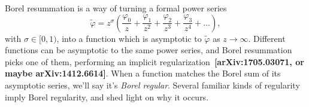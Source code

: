 \documentclass{article}
\newcommand{\series}[1]{\tilde{#1}}
\begin{document}
Borel resummation is a way of turning a formal power series
\[ \series{\varphi} = z^\sigma \left( \frac{\varphi_0}{z} + \frac{\varphi_1}{z^2} + \frac{\varphi_2}{z^3} + \frac{\varphi_3}{z^4} + \ldots \right), \]
with $\sigma \in [0, 1)$, into a function which is asymptotic to $\series{\varphi}$ as $z \to \infty$. Different functions can be asymptotic to the same power series, and Borel resummation picks one of them, performing an implicit regularization~\textbf{[arXiv:1705.03071, or maybe arXiv:1412.6614]}. When a function matches the Borel sum of its asymptotic series, we'll say it's {\em Borel regular}. Several familiar kinds of regularity imply Borel regularity, and shed light on why it occurs.
\end{document}
